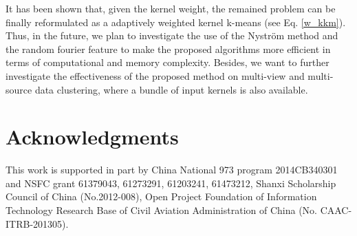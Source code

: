 \documentclass{article}
\begin{document}
It has been shown that, given the kernel weight, the remained problem can be finally reformulated as a adaptively weighted kernel k-means (see Eq. \eqref{w_kkm}). Thus, in the future, we plan to investigate the use of the Nystr{\"o}m method \cite{elgohary2014Embd} and the random fourier feature \cite{yang2012nystrom} to make the proposed algorithms more efficient in terms of computational and memory complexity. Besides, we want to further investigate the effectiveness of the proposed method on multi-view and multi-source data clustering, where a bundle of input kernels is also available.
\section{Acknowledgments}
This work is supported in part by China National 973 program 2014CB340301 and NSFC grant 61379043, 61273291, 61203241, 61473212, Shanxi Scholarship Council of China (No.2012-008), Open Project Foundation of Information Technology Research Base of Civil Aviation Administration of China (No. CAAC-ITRB-201305).

\nocite{*}


\end{document}

